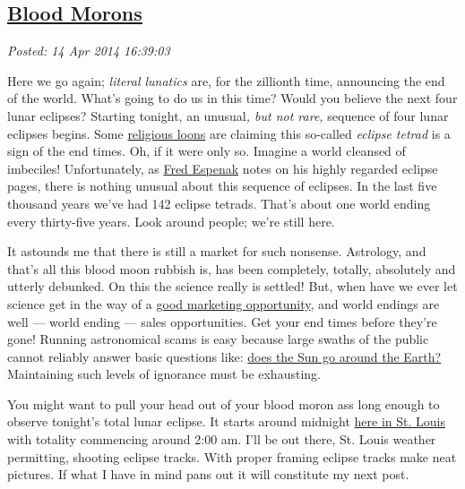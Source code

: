 %

\subsection*{\href{https://bakerjd99.wordpress.com/2014/04/14/blood-morons/}{Blood Morons}}


\noindent\emph{Posted: 14 Apr 2014 16:39:03}
\vspace{6pt}

Here we go again; \emph{literal lunatics} are, for the zillionth time,
announcing the end of the world. What's going to do us in this time?
Would you believe the next four lunar eclipses? Starting tonight, an
unusual\emph{, but not rare,} sequence of four lunar eclipses begins.
Some
\href{http://www.nydailynews.com/news/national/televangelist-claims-blood-moons-sign-world-shaking-event-article-1.1754601}{religious
loons} are claiming this so-called \emph{eclipse tetrad} is a sign of
the end times. Oh, if it were only so. Imagine a world cleansed of
imbeciles! Unfortunately, as
\href{http://eclipse.gsfc.nasa.gov/OH/OH2014.html\#tetrads}{Fred
Espenak} notes on his highly regarded eclipse pages, there is nothing
unusual about this sequence of eclipses. In the last five thousand
years we've had 142 eclipse tetrads. That's about one world ending
every thirty-five years. Look around people; we're still here.

It astounds me that there is still a market for such nonsense.
Astrology, and that's all this blood moon rubbish is, has been
completely, totally, absolutely and utterly debunked. On this the
science really is settled! But, when have we ever let science get in the
way of a \href{http://fourbloodmoons.net/}{good marketing opportunity},
and world endings are well --- world ending --- sales opportunities.
Get your end times before they're gone! Running astronomical scams is
easy because large swaths of the public cannot reliably answer basic
questions like:
\href{http://www.npr.org/blogs/thetwo-way/2014/02/14/277058739/1-in-4-americans-think-the-sun-goes-around-the-earth-survey-says}{does
the Sun go around the Earth?} Maintaining such levels of ignorance must
be exhausting.

You might want to pull your head out of your blood moron ass long enough
to observe tonight's total lunar eclipse. It starts around midnight
\href{http://blog.realtimestl.com/2014/04/when-and-how-to-watch-the-lunar-eclipse-in-st-louis/}{here
in St. Louis} with totality commencing around 2:00 am. I'll be out
there, St. Louis weather permitting, shooting eclipse tracks. With
proper framing eclipse tracks make neat pictures. If what I have in mind
pans out it will constitute my next post.



%